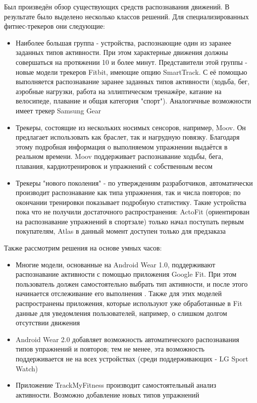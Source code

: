 Был произведён обзор существующих средств распознавания движений. В результате было выделено несколько классов решений. Для специализированных фитнес-трекеров они следующие:
\begin{itemize}
\item Наиболее большая группа - устройства, распознающие один из заранее заданных типов активности. При этом характерные движения должны совершаться на протяжении 10 и более минут. Представители этой группы - новые модели трекеров Fitbit, имеющие опцию SmartTrack. С её помощью выполняется распознавание заранее заданных типов активности (ходьба, бег, аэробные нагрузки, работа на эллиптическом тренажёре, катание на велосипеде, плавание и общая категория "спорт"). Аналогичные возможности имеет трекер Samsung Gear
\item Трекеры, состоящие из нескольких носимых сенсоров, например, Moov. Он предлагает использовать как браслет, так и нагрудную повязку. Благодаря этому подробная информация о выполняемом упражнении выдаётся в реальном времени. Moov поддерживает распознавание ходьбы, бега, плавания, кардиотренировок и упражнений с собственным весом
\item Трекеры "нового поколения" - по утверждениям разработчиков, автоматически производит распознавание как типа упражнения, так и числа повторов; по окончании тренировки показывает подробную статистику. Такие устройства пока что не получили достаточного распространения: ActoFit (ориентирован на распознавание упражнений в спортзале) только начал поступать первым покупателям, Atlas в данный момент доступен только для предзаказа
\end{itemize}

Также рассмотрим решения на основе умных часов:
\begin{itemize}
\item Многие модели, основанные на Android Wear 1.0, поддерживают распознавание активности с помощью приложения Google Fit. При этом пользователь должен самостоятельно выбрать тип активности, и после этого начинается отслеживание его выполнения . Также для этих моделей распространены приложения, которые используют уже обработанные в Fit данные для уведомления пользователей, например, о слишком долгом отсутствии движения
\item Android Wear 2.0 добавляет возможность автоматического распознавания типов упражнений и повторов; тем не менее, эта возможность поддерживается не на всех устройствах (среди поддерживающих - LG Sport Watch)
\item Приложение TrackMyFitness производит самостоятельный анализ активности. Возможно добавление новых типов упражнений 
\end{itemize}

